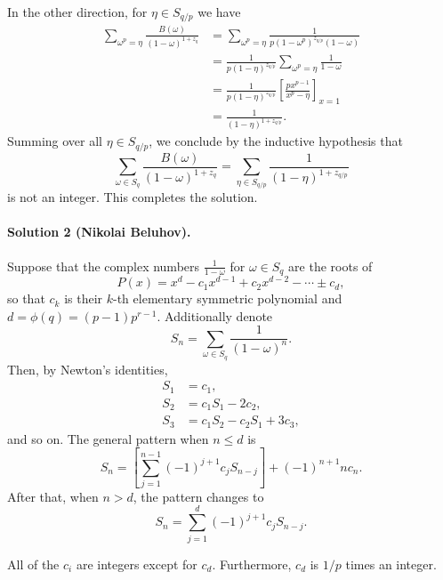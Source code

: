 \documentclass[11pt]{scrartcl}
\begin{document}
In the other direction, for $\eta\in S_{q/p}$ we have
\begin{align*}
  \sum_{\omega^p = \eta} \frac{B(\omega)}{(1-\omega)^{1+z_q}} &=
  \sum_{\omega^p=\eta}\frac{1}{p(1-\omega^p)^{z_{q/p}}(1-\omega)} \\
& = \frac{1}{p(1-\eta)^{z_{q/p}}}\sum_{\omega^p = \eta} \frac{1}{1-\omega} \\
& = \frac{1}{p(1-\eta)^{z_{q/p}}}\left[\frac{px^{p-1}}{x^p - \eta}\right]_{x=1}
\\
& = \frac{1}{(1-\eta)^{1 + z_{q/p}}}.
\end{align*}
Summing over all $\eta\in S_{q/p}$, we conclude by the inductive hypothesis that
\[\sum_{\omega\in S_q}\frac{B(\omega)}{(1-\omega)^{1+z_q}}=\sum_{\eta\in
S_{q/p}}\frac{1}{(1-\eta)^{1+z_{q/p}}}\]
is not an integer. This completes the solution.

\paragraph{Solution 2 (Nikolai Beluhov).} %

Suppose that the complex numbers $\frac{1}{1-\omega}$ for $\omega \in S_q$ are
the roots of
\[P(x) = x^d - c_1x^{d - 1} + c_2x^{d - 2} - \dotsb \pm c_d,\]
so that $c_k$ is their $k$-th elementary symmetric polynomial and $d = \phi(q) =
(p - 1)p^{r - 1}$. Additionally denote
\[S_n = \sum_{\omega\in S_q} \frac{1}{(1 - \omega)^n}.\]
Then, by Newton's identities,
\begin{align*}
  S_1 &= c_1, \\
  S_2 &= c_1S_1 - 2c_2, \\
  S_3 &= c_1S_2 - c_2S_1 + 3c_3,
\end{align*}
and so on. The general pattern when $n\leq d$ is
\[S_n = \left[\sum_{j = 1}^{n - 1} (-1)^{j + 1}c_jS_{n - j}\right] + (-1)^{n +
1}nc_n.\]
After that, when $n > d$, the pattern changes to
\[S_n = \sum_{j = 1}^d (-1)^{j + 1}c_jS_{n - j}.\]

\begin{lemma*}
  All of the $c_i$ are integers except for $c_d$. Furthermore, $c_d$ is $1/p$
  times an integer.
\end{lemma*}
\end{document}
